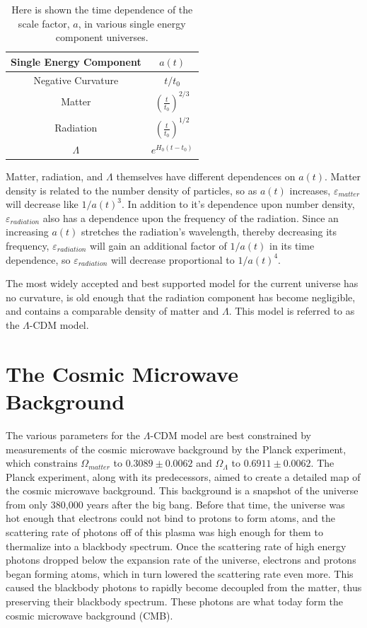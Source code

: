 \begin{table}[h!]
\begin{center}
  \begin{tabular}{ c | c  }
    Single Energy Component & $a(t)$ \\ \hline
    \hline
    Negative Curvature & $t/t_{0}$  \\ \hline
    Matter & $(\frac{t}{t_{0}})^{2/3}$  \\ \hline
    Radiation & $(\frac{t}{t_{0}})^{1/2}$  \\ \hline
    $\Lambda$ & $e^{H_{0}(t-t_{0})}$ \\
  \end{tabular}
\end{center}
\caption{Here is shown the time dependence of the scale factor, $a$, in various single energy component universes.}\label{table:energy components}
\end{table}

Matter, radiation, and $\Lambda$ themselves have different dependences on $a(t)$. Matter density is related to the number density of particles, so as $a(t)$ increases, $\varepsilon_{matter}$ will decrease like $1/a(t)^{3}$. In addition to it's dependence upon number density, $\varepsilon_{radiation}$ also has a dependence upon the frequency of the radiation. Since an increasing $a(t)$ stretches the radiation's wavelength, thereby decreasing its frequency, $\varepsilon_{radiation}$ will gain an additional factor of $1/a(t)$ in its time dependence, so $\varepsilon_{radiation}$ will decrease proportional to $1/a(t)^{4}$\cite{ryden}.

The most widely accepted and best supported model for the current universe has no curvature, is old enough that the radiation component has become negligible, and contains a comparable density of matter and $\Lambda$. This model is referred to as the $\Lambda$-CDM model. 

\section{The Cosmic Microwave Background}
The various parameters for the $\Lambda$-CDM model are best constrained by measurements of the cosmic microwave background by the Planck experiment, which constrains $\Omega_{matter}$ to $0.3089 \pm 0.0062$ and $\Omega_{\Lambda}$ to $0.6911 \pm 0.0062$\cite{planck2015}. The Planck experiment, along with its predecessors, aimed to create a detailed map of the cosmic microwave background. This background is a snapshot of the universe from only 380,000 years after the big bang\cite{wmap_decoupling}. Before that time, the universe was hot enough that electrons could not bind to protons to form atoms, and the scattering rate of photons off of this plasma was high enough for them to thermalize into a blackbody spectrum. Once the scattering rate of high energy photons dropped below the expansion rate of the universe, electrons and protons began forming atoms, which in turn lowered the scattering rate even more. This caused the blackbody photons to rapidly become decoupled from the matter, thus preserving their blackbody spectrum. These photons are what today form the cosmic microwave background (CMB).

